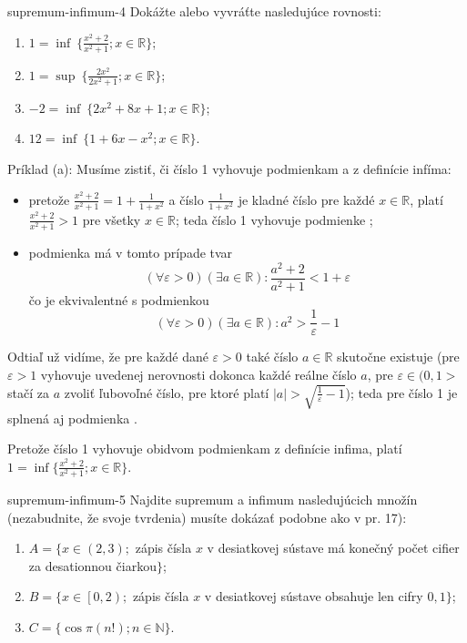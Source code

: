 \begin{defproblem}{supremum-infimum-4}
Dokážte alebo vyvráťte nasledujúce rovnosti:

\begin{enumerate}
  \item $1 = \inf \: \{ \frac{x^2 + 2}{x^2 + 1}; x \in \mathbb{R} \}$;
  \item $1 = \sup \: \{ \frac{2x^2}{2x^2 + 1}; x \in \mathbb{R} \}$;
  \item $-2 = \inf \: \{ 2x^2 + 8x + 1; x \in \mathbb{R} \}$;
  \item $12 = \inf \: \{ 1 + 6x - x^2; x \in \mathbb{R} \}$.
\end{enumerate}

\begin{solution}
  Príklad (a): Musíme zistiť, či číslo 1 vyhovuje podmienkam  a
   z definície infíma:

  \begin{itemize}
    \item[\ding{34}] pretože $\frac{x^2 + 2}{x^2 + 1} = 1 + \frac{1}{1 + x^2}$ a číslo
        $\frac{1}{1 + x^2}$ je kladné číslo pre každé $x \in \mathbb{R}$, platí
        $\frac{x^2 + 2}{x^2 + 1} > 1$ pre všetky $x \in \mathbb{R}$; teda číslo
        1 vyhovuje podmienke ;
    \item[\ding{37}] podmienka má v tomto prípade tvar
          $$(\forall \varepsilon > 0) (\exists a \in \mathbb{R}):
            \frac{a^2 + 2}{a^2 + 1} < 1 + \varepsilon$$
          čo je ekvivalentné s podmienkou
          $$(\forall \varepsilon > 0) (\exists a \in \mathbb{R}):
            a^2 > \frac{1}{\varepsilon} - 1$$
  \end{itemize}

  Odtiaľ už vidíme, že pre každé dané $\varepsilon > 0$ také číslo
  $a \in \mathbb{R}$ skutočne existuje (pre $\varepsilon > 1$ vyhovuje
  uvedenej nerovnosti dokonca každé reálne číslo $a$, pre
  $\varepsilon \in (0, 1>$ stačí za $a$ zvoliť ľubovoľné číslo, pre ktoré
  platí $|a| > \sqrt{\frac{1}{\varepsilon} - 1}$); teda pre číslo 1 je splnená
  aj podmienka .

  Pretože číslo 1 vyhovuje obidvom podmienkam z definície infima, platí
  $1 = \inf \{ \frac{x^2 + 2}{x^2 + 1}; x \in \mathbb{R} \}$.
\end{solution}
\end{defproblem}

\begin{defproblem}{supremum-infimum-5}
Najdite supremum a infimum nasledujúcich množín (nezabudnite, že svoje tvrdenia)
musíte dokázať podobne ako v pr. 17):

\begin{enumerate}[label=\arabic*.]
  \item $A = \{ x \in (2, 3);$ zápis čísla $x$ v desiatkovej sústave má konečný
        počet cifier za desationnou čiarkou$\}$;
  \item $B = \{ x \in \left[0, 2\right);$ zápis čísla $x$ v desiatkovej sústave obsahuje
        len cifry $0, 1 \}$;
  \item $C = \{ \cos \pi(n!); n \in \mathbb{N} \}$.
\end{enumerate}
\end{defproblem}

